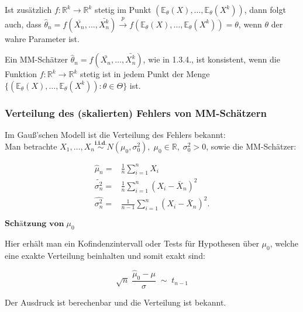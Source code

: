 \documentclass[10pt]{article}
\newcommand{\FZV}{X_1, \ldots, X_n} %
\newcommand{\IR}{\mathbb{R}} %
\newcommand{\EW}{\mathbb{E}} %
\begin{document}
\begin{enumerate}
	Ist zusätzlich $f: \IR^k \rightarrow \IR^k$ stetig im Punkt $(\EW_\theta(X),\ldots,\EW_\theta(X^k))$, dann folgt auch, dass $\hat{\theta}_n = f(\bar{X_n}, \ldots, \bar{X^k_n}) \overset{p} \rightarrow f(\EW_\theta(X),\ldots,\EW_\theta(X^k)) = \theta$, wenn $\theta$ der wahre Parameter ist. 

	\begin{Definition}
	Ein MM-Schätzer $\hat\theta_n = f(\bar{X_n},\ldots,\bar{X^k_n})$, wie in 1.3.4., ist konsistent, wenn die Funktion $f:\IR ^k \rightarrow \IR ^k$ stetig ist in jedem Punkt der Menge $\{(\EW_\theta(X),\ldots, \EW_\theta(X^k)) : \theta \in \Theta\}$ ist.	\end{Definition}

\end{enumerate}

\subsubsection{Verteilung des (skalierten) Fehlers von MM-Schätzern}

	Im Gauß'schen Modell ist die Verteilung des Fehlers bekannt: \\
	Man  betrachte $\FZV \overset{\textbf{i.i.d.}} {\sim} N(\mu_0,\sigma_0^2),\; \mu_0 \in \IR, \; \sigma_0^2 >0$, sowie die MM-Schätzer:
	
	\begin{equation*}
	\begin{split}
		\hat{\mu}_n =& \frac{1}{n}\sum_{i=1}^{n} X_i\\
		\tilde{\sigma^2_n} =&\frac{1}{n}\sum_{i=1}^{n} (X_i - \bar{X}_n)^2\\
		\hat{\sigma^2_n}=&\frac{1}{n-1}\sum_{i=1}^{n} (X_i - \bar{X}_n)^2.
	\end{split}
	\end{equation*}
	
		\noindent $\textbf{Schätzung von} \; \mu_0$
	
		\noindent Hier  erhält man ein Kofindenzintervall oder Tests für Hypothesen über $\mu_0$, welche eine exakte Verteilung beinhalten und somit exakt sind:
	
	\begin{equation*}
		\sqrt{n} \; \frac{\hat{\mu}_0 - \mu}{\hat{\sigma}} \;{\sim}\; t_{n-1}
	\end{equation*}
	
		\noindent Der Ausdruck ist berechenbar und die Verteilung ist bekannt.\\
\end{document}
